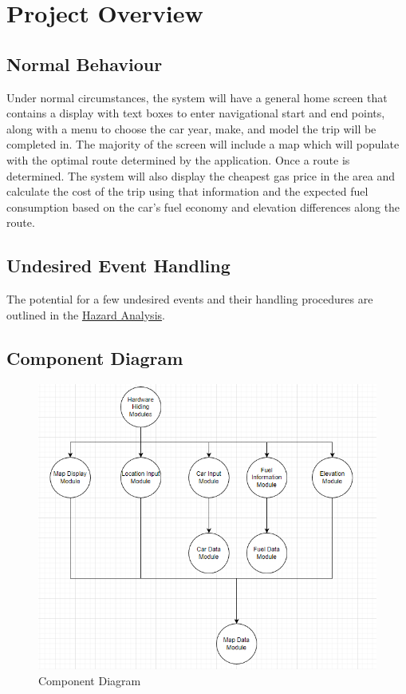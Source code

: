 \documentclass[12pt, titlepage]{article}
\begin{document}
\section{Project Overview}

\subsection{Normal Behaviour}
Under normal circumstances, the system will have a general home screen that contains a display with text boxes to enter navigational start and end points, along with a menu to choose the car year, make, and model the trip will be completed in. The majority of the screen will include a map which will populate with the optimal route determined by the application. Once a route is determined. The system will also display the cheapest gas price in the area and calculate the cost of the trip using that information and the expected fuel consumption based on the car's fuel economy and elevation differences along the route.\\

\subsection{Undesired Event Handling}

The potential for a few undesired events and their handling procedures are outlined in the \href{https://github.com/mehtaj8/Greenway/blob/main/docs/HazardAnalysis/HazardAnalysis.pdf}{Hazard Analysis}.\\

\newpage
\subsection{Component Diagram}

\begin{figure}[h!]
    \centering
    \includegraphics[scale=1]{images/component-diagram.png}
    \caption{Component Diagram}
\end{figure}
\end{document}
